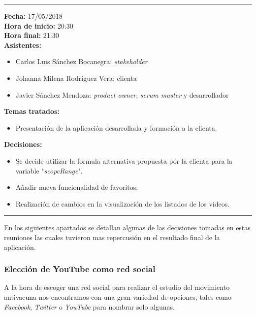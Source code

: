 \documentclass[11pt,a4paper]{article}
\begin{document}
\begin{center}\rule{10cm}{0.4pt}\end{center}

\noindent\textbf{Fecha:} 17/05/2018
\\
\noindent\textbf{Hora de inicio:} 20:30
\\
\noindent\textbf{Hora final:} 21:30
\\
\noindent\textbf{Asistentes:} 
\begin{itemize}
\item Carlos Luis Sánchez Bocanegra: \textit{stakeholder}
\item Johanna Milena Rodríguez Vera: clienta
\item Javier Sánchez Mendoza: \textit{product owner}, \textit{scrum master} y desarrollador
\end{itemize}
\noindent\textbf{Temas tratados:}
\begin{itemize}
\item Presentación de la aplicación desarrollada y formación a la clienta.
\end{itemize}
\noindent\textbf{Decisiones:}
\begin{itemize}
\item Se decide utilizar la formula alternativa propuesta por la clienta para la variable "\textit{scopeRange}".
\item Añadir nueva funcionalidad de favoritos.
\item Realización de cambios en la visualización de los listados de los vídeos.
\end{itemize}

\begin{center}\rule{10cm}{0.4pt}\end{center}

En los siguientes apartados se detallan algunas de las decisiones tomadas en estas reuniones las cuales tuvieron mas repercusión en el resultado final de la aplicación.
\medskip 

\subsubsection{Elección de YouTube como red social}\label{eleccionYouTube} 
A la hora de escoger una red social para realizar el estudio del movimiento antivacuna nos encontramos con una gran variedad de opciones, tales como \textit{Facebook}, \textit{Twitter} o \textit{YouTube} para nombrar solo algunas.
\\
\end{document}
